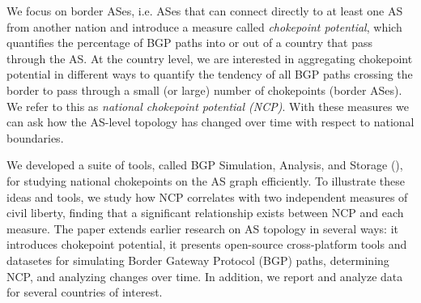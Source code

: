 We focus on border ASes, i.e. ASes that can connect directly to at least
one AS from another nation and introduce a measure called \emph{chokepoint potential}, which quantifies the percentage of BGP paths into or out of a country that pass through the AS.  At the country level, we are interested in aggregating chokepoint potential in different ways to quantify the tendency of all BGP paths crossing the border to pass through a small (or large) number of chokepoints (border ASes). We  refer to this as \emph{national chokepoint potential (NCP)}.
With these measures 
we can ask how the AS-level topology has changed over time with respect
to national boundaries. 

We developed a
suite of tools, called BGP Simulation, Analysis, and Storage (\toolname{}), for studying national 
chokepoints on
the AS graph efficiently. To illustrate these ideas and tools, we
study how NCP correlates with two independent
measures of civil liberty, finding that a significant relationship exists between NCP and each measure.
The paper extends earlier research on AS topology in several ways: it introduces chokepoint potential, it presents open-source cross-platform tools and datasetes for simulating Border Gateway Protocol (BGP) paths,
determining NCP, and analyzing changes over time.  In addition, we report and analyze data for several countries of interest.


